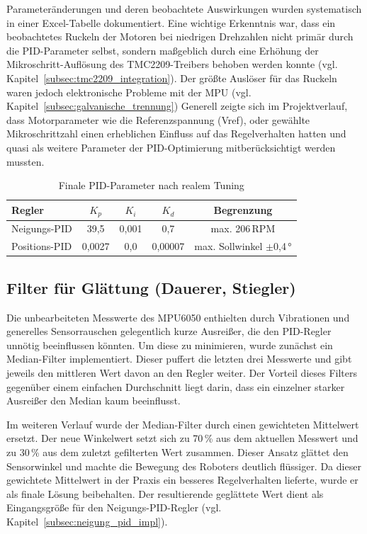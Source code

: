 \documentclass[fontsize=12pt,
parskip=half,	%
department=FakM,  %
logostyle=flat,
twoside, %
DIV=15,BCOR=10mm, %
]{OTHRreprt}
\begin{document}
Parameteränderungen und deren beobachtete Auswirkungen wurden systematisch in einer Excel-Tabelle
dokumentiert. Eine wichtige Erkenntnis war, dass ein beobachtetes Ruckeln der Motoren bei niedrigen
Drehzahlen nicht primär durch die PID-Parameter selbst, sondern maßgeblich durch eine Erhöhung der
Mikroschritt-Auf\-lö\-sung des TMC2209-Treibers behoben werden konnte (vgl. Kapitel~\ref{subsec:tmc2209_integration}).
Der größte Auslöser für das Ruckeln waren jedoch elektronische Probleme mit der MPU
(vgl. Kapitel~\ref{subsec:galvanische_trennung})
Generell zeigte sich im Projektverlauf, dass Motorparameter wie die Referenzspannung (Vref),
oder gewählte Mikroschrittzahl einen erheblichen Einfluss
auf das Regelverhalten hatten und quasi als weitere Parameter der PID-Optimierung
mitberücksichtigt werden mussten.

\begin{table}[h]
    \centering
    \caption{Finale PID-Parameter nach realem Tuning}
    \label{tab:pid_final}
    \begin{tabular}{|l|c|c|c|c|}
        \hline
        \textbf{Regler} & \textbf{$K_p$} & \textbf{$K_i$} & \textbf{$K_d$} & \textbf{Begrenzung} \\
        \hline
        Neigungs-PID & 39{,}5 & 0{,}001 & 0{,}7 & max. 206\,RPM \\
        \hline
        Positions-PID & 0{,}0027 & 0{,}0 & 0{,}00007 & max. Sollwinkel $\pm$0{,}4\,° \\
        \hline
\end{tabular}
\end{table}

\subsection{Filter für Glättung (Dauerer, Stiegler)}
\label{subsec:median_filter}

Die unbearbeiteten Messwerte des MPU6050 enthielten durch Vibrationen 
und generelles Sensorrauschen gelegentlich
kurze Ausreißer, die den PID-Regler unnötig beeinflussen könnten. Um diese zu minimieren, 
wurde zunächst ein Median-Filter implementiert. Dieser puffert die letzten drei Messwerte
und gibt jeweils den mittleren Wert davon an den Regler weiter. Der Vorteil
dieses Filters gegenüber einem einfachen Durchschnitt liegt darin, dass ein einzelner
starker Ausreißer den Median kaum beeinflusst.

Im weiteren Verlauf wurde der Median-Filter durch einen gewichteten Mittelwert ersetzt.
Der neue Winkelwert setzt sich zu 70\,\% aus dem aktuellen Messwert und zu 30\,\% aus
dem zuletzt gefilterten Wert zusammen. Dieser Ansatz glättet den Sensorwinkel und machte
die Bewegung des Roboters deutlich flüssiger. Da dieser gewichtete Mittelwert in der Praxis
ein besseres Regelverhalten lieferte, wurde er als finale Lösung beibehalten. Der resultierende geglättete
Wert dient als Eingangsgröße für den Neigungs-PID-Regler (vgl. Kapitel~\ref{subsec:neigung_pid_impl}).
\end{document}
